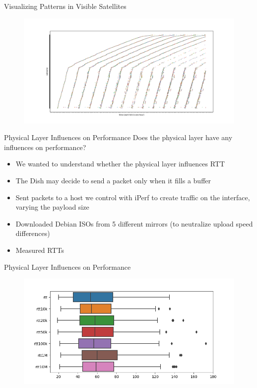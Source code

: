 \documentclass[NET,english,beameralt]{tumbeamer}
\begin{document}
\begin{frame}{Visualizing Patterns in Visible Satellites}
    \begin{figure}
        \includegraphics[width=1\textwidth]{pics/patterns-in-satellite-appearances.pdf}
    \end{figure}
\end{frame}

\begin{frame}{Physical Layer Influences on Performance}
    Does the physical layer have any influences on performance? 
    \begin{itemize}
        \item We wanted to understand whether the physical layer influences RTT
        \item The Dish may decide to send a packet only when it fills a buffer
        \item Sent packets to a host we control with iPerf to create traffic on the interface, varying the payload size
        \item Downloaded Debian ISOs from 5 different mirrors (to neutralize upload speed differences)
        \item Measured RTTs 
    \end{itemize}
\end{frame}

\begin{frame}{{Physical Layer Influences on Performance}}
    \begin{figure}
        \includegraphics[width=1\textwidth]{pics/rtt-iperf-stress.png}
    \end{figure}
\end{frame}
\end{document}
